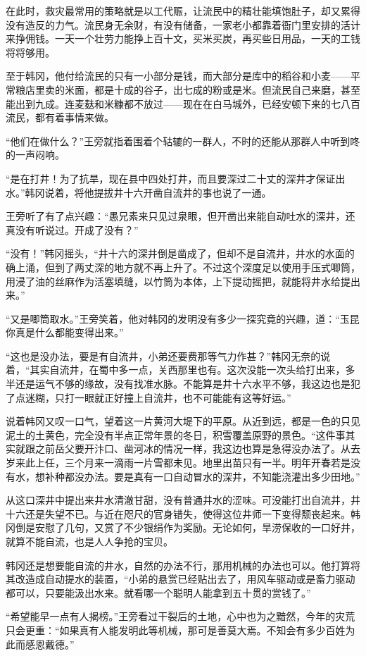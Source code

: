 在此时，救灾最常用的策略就是以工代赈，让流民中的精壮能填饱肚子，却又累得没有造反的力气。流民身无余财，有没有储备，一家老小都靠着衙门里安排的活计来挣佣钱。一天一个壮劳力能挣上百十文，买米买炭，再买些日用品，一天的工钱将将够用。

至于韩冈，他付给流民的只有一小部分是钱，而大部分是库中的稻谷和小麦——平常粮店里卖的米面，都是十成的谷子，出七成的粉或是米。但流民自己来磨，甚至能出到九成。连麦麸和米糠都不放过——现在在白马城外，已经安顿下来的七八百流民，都有着事情来做。

“他们在做什么？”王旁就指着围着个轱辘的一群人，不时的还能从那群人中听到咚的一声闷响。

“是在打井！为了抗旱，现在县中四处打井，而且要深过二十丈的深井才保证出水。”韩冈说着，将他提拔井十六开凿自流井的事也说了一通。

王旁听了有了点兴趣：“愚兄素来只见过泉眼，但开凿出来能自动吐水的深井，还真没有听说过。开成了没有？”

“没有！”韩冈摇头，“井十六的深井倒是凿成了，但却不是自流井，井水的水面的确上涌，但到了两丈深的地方就不再上升了。不过这个深度足以使用手压式唧筒，用浸了油的丝麻作为活塞填缝，以竹筒为本体，上下提动摇把，就能将井水给提出来。”

“又是唧筒取水。”王旁笑着，他对韩冈的发明没有多少一探究竟的兴趣，道：“玉昆你真是什么都能变得出来。”

“这也是没办法，要是有自流井，小弟还要费那等气力作甚？”韩冈无奈的说着，“其实自流井，在蜀中多一点，关西那里也有。这次没能一次头给打出来，多半还是运气不够的缘故，没有找准水脉。不能算是井十六水平不够，我这边也是犯了点迷糊，只打一眼就正好撞上自流井，也不可能能有这等好运。”

说着韩冈又叹一口气，望着这一片黄河大堤下的平原。从近到远，都是一色的只见泥土的土黄色，完全没有半点正常年景的冬日，积雪覆盖原野的景色。“这件事其实就跟之前岳父要开汴口、凿河冰的情况一样，我这边也算是急得没办法了。从去岁来此上任，三个月来一滴雨一片雪都未见。地里出苗只有一半。明年开春若是没有水，想补种都没办法。要是真有一口自动冒水的深井，不知能浇灌出多少田地。”

从这口深井中提出来井水清澈甘甜，没有普通井水的涩味。可没能打出自流井，井十六还是失望不已。与近在咫尺的官身错失，使得这位井师一下变得颓丧起来。韩冈倒是安慰了几句，又赏了不少银绢作为奖励。无论如何，旱涝保收的一口好井，就算不能自流，也是人人争抢的宝贝。

韩冈还是想要能自流的井水，自然的办法不行，那用机械的办法也可以。他打算将其改造成自动提水的装置，“小弟的悬赏已经贴出去了，用风车驱动或是畜力驱动都可以，只要能汲出水来。就看哪一个聪明人能拿到五十贯的赏钱了。”

“希望能早一点有人揭榜。”王旁看过干裂后的土地，心中也为之黯然，今年的灾荒只会更重：“如果真有人能发明此等机械，那可是善莫大焉。不知会有多少百姓为此而感恩戴德。”

